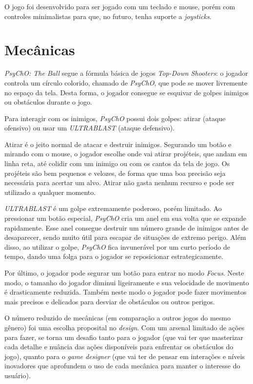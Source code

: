 O jogo foi desenvolvido para ser jogado com um teclado e mouse, porém com controles minimalistas para que, no futuro, tenha suporte a \textit{joysticks}.

\section{Mecânicas}
\label{sec:mecanicas}

\textit{PsyChO: The Ball} segue a fórmula básica de jogos \textit{Top-Down Shooters}: o jogador controla um círculo colorido, chamado de \textit{PsyChO}, que pode se mover livremente no espaço da tela. Desta forma, o jogador consegue se esquivar de golpes inimigos ou obstáculos durante o jogo.

Para interagir com os inimigos, \textit{PsyChO} possui dois golpes: atirar (ataque ofensivo) ou usar um \textit{ULTRABLAST} (ataque defensivo).

Atirar é o jeito normal de atacar e destruir inimigos. Segurando um botão e mirando com o mouse, o jogador escolhe onde vai atirar projéteis, que andam em linha reta, até colidir com um inimigo ou com os cantos da tela de jogo. Os projéteis são bem pequenos e velozes, de forma que uma boa precisão seja necessária para acertar um alvo. Atirar não gasta nenhum recurso e pode ser utilizado a qualquer momento.

\textit{ULTRABLAST} é um golpe extremamente poderoso, porém limitado. Ao pressionar um botão especial, \textit{PsyChO} cria um anel em sua volta que se expande rapidamente. Esse anel consegue destruir um número grande de inimigos antes de desaparecer, sendo muito útil para escapar de situações de extremo perigo. Além disso, ao utilizar o golpe, \textit{PsyChO} fica invunerável por um curto período de tempo, dando uma folga para o jogador se reposicionar estrategicamente.

Por último, o jogador pode segurar um botão para entrar no modo \textit{Focus}. Neste modo, o tamanho do jogador diminui ligeiramente e sua velocidade de movimento é drasticamente reduzida. Também neste modo o jogador pode fazer movimentos mais precisos e delicados para desviar de obstáculos ou outros perigos.

O número reduzido de mecânicas (em comparação a outros jogos do mesmo gênero) foi uma escolha proposital no \textit{design}. Com um arsenal limitado de ações para fazer, se torna um desafio tanto para o jogador (que vai ter que masterizar cada detalhe e nuância das ações disponíveis para enfrentar os obstáculos do jogo), quanto para o \textit{game designer} (que vai ter de pensar em interações e níveis inovadores que aprofundem o uso de cada mecânica para manter o interesse do usuário).

